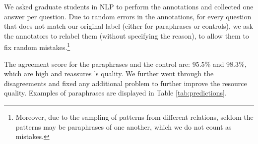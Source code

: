 We asked graduate students in NLP to perform the annotations and collected one answer per question.
Due to random errors in the annotations, for every question that does not match our original label (either for paraphrases or controls), we ask the annotators to relabel them (without specifying the reason), to allow them to fix random mistakes.\footnote{Moreover, due to the sampling of patterns from different relations, seldom the patterns may be paraphrases of one another, which we do not count as mistakes.}

The agreement score for the paraphrases and the control are: 95.5\% and 98.3\%, which are high and reassures \resource's quality.
We further went through the disagreements  %
and fixed any additional problem %
to further improve the resource quality.
Examples of paraphrases are displayed in Table \ref{tab:predictions}. 
% 

